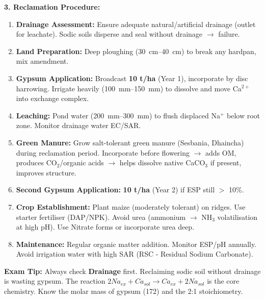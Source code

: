 \documentclass[11pt]{article}
\begin{document}
\begin{exoresolu}
\noindent\textbf{3. Reclamation Procedure:}
\begin{enumerate}
\item \textbf{Drainage Assessment:} Ensure adequate natural/artificial drainage (outlet for leachate). Sodic soils disperse and seal without drainage $\rightarrow$ failure.
\item \textbf{Land Preparation:} Deep ploughing (\SIrange{30}{40}{cm}) to break any hardpan, mix amendment.
\item \textbf{Gypsum Application:} Broadcast \textbf{10 t/ha} (Year 1), incorporate by disc harrowing. Irrigate heavily (\SIrange{100}{150}{mm}) to dissolve and move Ca$^{2+}$ into exchange complex.
\item \textbf{Leaching:} Pond water (\SIrange{200}{300}{mm}) to flush displaced Na$^+$ below root zone. Monitor drainage water EC/SAR.
\item \textbf{Green Manure:} Grow salt-tolerant green manure (Sesbania, Dhaincha) during reclamation period. Incorporate before flowering $\rightarrow$ adds OM, produces CO$_2$/organic acids $\rightarrow$ helps dissolve native CaCO$_3$ if present, improves structure.
\item \textbf{Second Gypsum Application:} \textbf{10 t/ha} (Year 2) if ESP still $>$ 10\%.
\item \textbf{Crop Establishment:} Plant maize (moderately tolerant) on ridges. Use starter fertiliser (DAP/NPK). Avoid urea (ammonium $\rightarrow$ NH$_3$ volatilisation at high pH). Use Nitrate forms or incorporate urea deep.
\item \textbf{Maintenance:} Regular organic matter addition. Monitor ESP/pH annually. Avoid irrigation water with high SAR (RSC - Residual Sodium Carbonate).
\end{enumerate}

\noindent\textbf{Exam Tip:} Always check \textbf{Drainage} first. Reclaiming sodic soil without drainage is wasting gypsum. The reaction $2Na_{ex} + Ca_{sol} \rightarrow Ca_{ex} + 2Na_{sol}$ is the core chemistry. Know the molar mass of gypsum (172) and the 2:1 stoichiometry.
\end{exoresolu}
\end{document}
